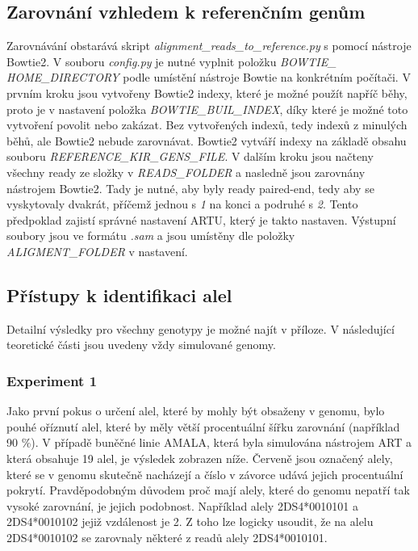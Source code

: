 \documentclass[czech,DP]{thesiskiv}
\numberwithin{equation}{section}
\begin{document}
\subsection{Zarovnání vzhledem k referenčním genům}
Zarovnávání obstarává skript \textit{alignment\_reads\_to\_reference.py} s pomocí nástroje Bowtie2. V souboru \textit{config.py} je nutné vyplnit položku \textit{BOWTIE\_} \\ \textit{HOME\_DIRECTORY} podle umístění nástroje Bowtie na konkrétním počítači. V prvním kroku jsou vytvořeny Bowtie2 indexy, které je možné použít napříč běhy, proto je v nastavení položka \textit{BOWTIE\_BUIL\_INDEX}, díky které je možné toto vytvoření povolit nebo zakázat. Bez vytvořených indexů, tedy indexů z minulých běhů, ale Bowtie2 nebude zarovnávat. Bowtie2 vytváří indexy na základě obsahu souboru \textit{REFERENCE\_KIR\_GENS\_FILE}. V dalším kroku jsou načteny všechny ready ze složky v \textit{READS\_FOLDER} a nasledně jsou zarovnány nástrojem Bowtie2. Tady je nutné, aby byly ready paired-end, tedy aby se vyskytovaly dvakrát, příčemž jednou s \textit{1} na konci a podruhé s \textit{2}. Tento předpoklad zajistí správné nastavení ARTU, který je takto nastaven. Výstupní soubory jsou ve formátu \textit{.sam} a jsou umístěny dle položky \textit{ALIGMENT\_FOLDER} v nastavení. 

\subsection{Přístupy k identifikaci alel}
Detailní výsledky pro všechny genotypy je možné najít v příloze. V následující teoretické části jsou uvedeny vždy simulované genomy.

\subsubsection{Experiment 1}
Jako první pokus o určení alel, které by mohly být obsaženy v genomu, bylo pouhé oříznutí alel, které by měly větší procentuální šířku zarovnání (například 90 \%).  V případě buněčné linie AMALA, která byla simulována nástrojem ART a která obsahuje 19 alel, je výsledek zobrazen níže. Červeně jsou označený alely, které se v genomu skutečně nacházejí a číslo v závorce udává jejich procentuální pokrytí. Pravděpodobným důvodem proč mají alely, které do genomu nepatří tak vysoké zarovnání, je jejich podobnost. Například alely 2DS4*0010101 a 2DS4*0010102 jejiž vzdálenost je 2. Z toho lze logicky usoudit, že na alelu 2DS4*0010102 se zarovnaly některé z readů alely 2DS4*0010101.
\end{document}
